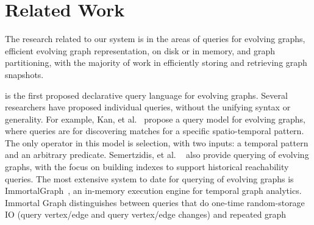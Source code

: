 \section{Related Work}
\label{sec:related}

The research related to our \ql system is in the areas of queries for
evolving graphs, efficient evolving graph representation, on disk or
in memory, and graph partitioning, with the majority of work in
efficiently storing and retrieving graph snapshots.

\ql is the first proposed declarative query language for evolving
graphs.  Several researchers have proposed individual queries, without
the unifying syntax or generality.  For example, Kan, et
al.~\cite{Kan2009} propose a query model for evolving graphs, where
queries are for discovering matches for a specific spatio-temporal
pattern.  The only operator in this model is selection, with two
inputs: a temporal pattern and an arbitrary predicate.   Semertzidis, et
al. ~\cite{Semertzidis2015} also provide querying of evolving graphs,
with the focus on building indexes to support historical reachability
queries.  The most extensive system
to date for querying of evolving graphs is
ImmortalGraph~\cite{DBLP:journals/tos/MiaoHLWYZPCC15}, an in-memory
execution engine for temporal graph analytics.  Immortal Graph
distinguishes between queries that do one-time random-storage IO
(query vertex/edge and query vertex/edge changes) and repeated graph
